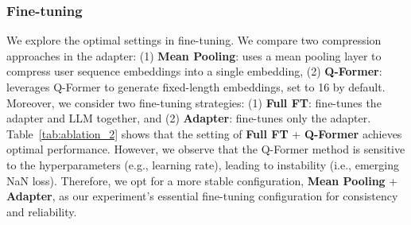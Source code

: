 
\subsubsection{\textbf{Fine-tuning}}
\label{sec:ablation_2}
We explore the optimal settings in fine-tuning.
We compare two compression approaches in the adapter: (1) \textbf{Mean Pooling}: uses a mean pooling layer to compress user sequence embeddings into a single embedding, (2) \textbf{Q-Former}: leverages Q-Former to generate fixed-length embeddings, set to 16 by default. 
Moreover, we consider two fine-tuning strategies: (1) \textbf{Full FT}: fine-tunes the adapter and LLM together, and (2) \textbf{Adapter}: fine-tunes only the adapter. Table~\ref{tab:ablation_2} shows that the setting of \textbf{Full FT} + \textbf{Q-Former} achieves optimal performance. However, we observe that the Q-Former method is sensitive to the hyperparameters (e.g., learning rate), leading to instability (i.e., emerging NaN loss). Therefore, we opt for a more stable configuration, \textbf{Mean Pooling} + \textbf{Adapter}, as our experiment's essential fine-tuning configuration for consistency and reliability.




